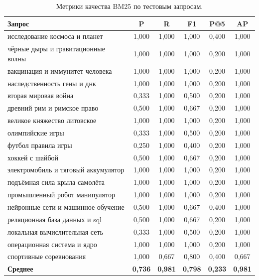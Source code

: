 \begin{table}[H]
	\centering
	\small
	\begin{tabular}{|p{5.6cm}|c|c|c|c|c|}
		\hline
		\textbf{Запрос} & \textbf{P} & \textbf{R} & \textbf{F1} & \textbf{P@5} & \textbf{AP} \\
		\hline
		исследование космоса и планет & 1,000 & 1,000 & 1,000 & 0,400 & 1,000 \\
		\hline
		чёрные дыры и гравитационные волны & 1,000 & 1,000 & 1,000 & 0,200 & 1,000 \\
		\hline
		вакцинация и иммунитет человека & 1,000 & 1,000 & 1,000 & 0,200 & 1,000 \\
		\hline
		наследственность гены и днк & 1,000 & 1,000 & 1,000 & 0,200 & 1,000 \\
		\hline
		вторая мировая война & 0,333 & 1,000 & 0,500 & 0,200 & 1,000 \\
		\hline
		древний рим и римское право & 0,500 & 1,000 & 0,667 & 0,200 & 1,000 \\
		\hline
		великое княжество литовское & 1,000 & 1,000 & 1,000 & 0,200 & 1,000 \\
		\hline
		олимпийские игры & 0,333 & 1,000 & 0,500 & 0,200 & 1,000 \\
		\hline
		футбол правила игры & 0,250 & 1,000 & 0,400 & 0,200 & 1,000 \\
		\hline
		хоккей с шайбой & 0,500 & 1,000 & 0,667 & 0,200 & 1,000 \\
		\hline
		электромобиль и тяговый аккумулятор & 1,000 & 1,000 & 1,000 & 0,200 & 1,000 \\
		\hline
		подъёмная сила крыла самолёта & 1,000 & 1,000 & 1,000 & 0,200 & 1,000 \\
		\hline
		промышленный робот манипулятор & 1,000 & 1,000 & 1,000 & 0,200 & 1,000 \\
		\hline
		нейронные сети и машинное обучение & 0,500 & 1,000 & 0,667 & 0,400 & 1,000 \\
		\hline
		реляционная база данных и sql & 0,500 & 1,000 & 0,667 & 0,200 & 1,000 \\
		\hline
		локальная вычислительная сеть & 0,333 & 1,000 & 0,500 & 0,200 & 1,000 \\
		\hline
		операционная система и ядро & 1,000 & 1,000 & 1,000 & 0,200 & 1,000 \\
		\hline
		спортивные соревнования & 1,000 & 0,667 & 0,800 & 0,400 & 0,667 \\
		\hline
		\textbf{Среднее} & \textbf{0,736} & \textbf{0,981} & \textbf{0,798} & \textbf{0,233} & \textbf{0,981} \\
		\hline
	\end{tabular}
	\caption{Метрики качества BM25 по тестовым запросам.}
	\label{tab:metrics}
\end{table}

